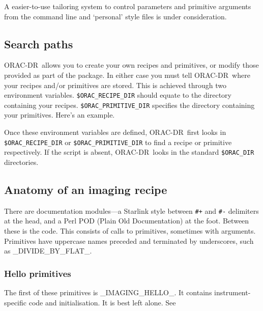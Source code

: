 \documentclass[twoside,11pt,nolof]{starlink}
\providecommand{\ORACDR}{{\footnotesize ORAC-DR}}
\begin{document}
A easier-to-use tailoring system to control parameters and primitive
arguments from the command line and `personal' style files is under
consideration.

\subsection{Search paths\label{search_paths}}

\ORACDR\ allows you to create your own recipes and primitives, or
modify those provided as part of the package.  In either case you must
tell \ORACDR\ where your recipes and/or primitives are stored.  This
is achieved through two environment variables.  {\tt\$ORAC\_RECIPE\_DIR}
should equate to the directory containing your recipes.
\texttt{\$ORAC\_PRIMITIVE\_DIR} specifies the directory containing your
primitives.  Here's an example.

\begin{terminalv}
\end{terminalv}

Once these environment variables are defined, \ORACDR\ first looks in
\texttt{\$ORAC\_RECIPE\_DIR} or \texttt{\$ORAC\_PRIMITIVE\_DIR} to find a recipe or
primitive respectively.  If the script is absent, \ORACDR\ looks in
the standard \texttt{\$ORAC\_DIR} directories.

\subsection{Anatomy of an imaging recipe}

There are documentation modules---a Starlink style between \verb/#+/ and
\verb/#-/ delimiters at the head, and a Perl POD (Plain Old
Documentation) at the foot.  Between these is the code.  This consists
of calls to primitives, sometimes with arguments.  Primitives have
uppercase names preceded and terminated by underscores, such as
\_DIVIDE\_BY\_FLAT\_.

\subsubsection{Hello
primitives\label{hello_primitives}}

The first of these primitives is \_IMAGING\_HELLO\_.
It contains instrument-specific code and initialisation.  It is
best left alone.  See
\end{document}
